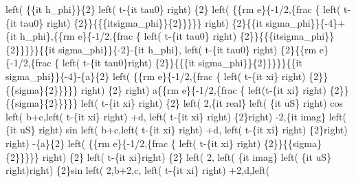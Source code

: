 \begin{maplegroup}
\begin{mapleinput}
\end{mapleinput}
\mapleresult
{}left( \{\{it h\_phi\}\}\{2\} left( t-\{it tau0\} right) \{2\} left( \{\{rm e\}\{-1/2,\{frac \{ left( t-\{it tau0\} right) \{2\}\}\{\{\{itsigma\_phi\}\}\{2\}\}\}\}\} right) \{2\}\{\{it sigma\_phi\}\}\{-4\}+\{it h\_phi\},\{\{rm e\}\{-1/2,\{frac \{ left( t-\{it tau0\} right) \{2\}\}\{\{\{itsigma\_phi\}\}\{2\}\}\}\}\}\{\{it sigma\_phi\}\}\{-2\}-\{it h\_phi\}, left( t-\{it tau0\} right) \{2\}\{\{rm e\}\{-1/2,\{frac \{ left( t-\{it tau0\}right) \{2\}\}\{\{\{it sigma\_phi\}\}\{2\}\}\}\}\}\{\{it sigma\_phi\}\}\{-4\}-\{a\}\{2\} left( \{\{rm e\}\{-1/2,\{frac \{ left( t-\{it xi\} right) \{2\}\}\{\{sigma\}\{2\}\}\}\}\} right) \{2\} right) a\{\{rm e\}\{-1/2,\{frac \{ left(t-\{it xi\} right) \{2\}\}\{\{sigma\}\{2\}\}\}\}\} left( t-\{it xi\} right) \{2\} left( 2,\{it real\} left( \{it uS\} right) cos left( b+c,left( t-\{it xi\} right) +d, left( t-\{it xi\} right) \{2\}right) -2,\{it imag\} left( \{it uS\} right) sin left( b+c,left( t-\{it xi\} right) +d, left( t-\{it xi\} right) \{2\}right)  right) -\{a\}\{2\} left( \{\{rm e\}\{-1/2,\{frac \{ left( t-\{it xi\} right) \{2\}\}\{\{sigma\}\{2\}\}\}\}\} right) \{2\} left( t-\{it xi\}right) \{2\} left( 2, left( \{it imag\} left( \{it uS\} right)right) \{2\}sin left( 2,b+2,c, left( t-\{it xi\} right) +2,d,left( 
\end{maplegroup}
